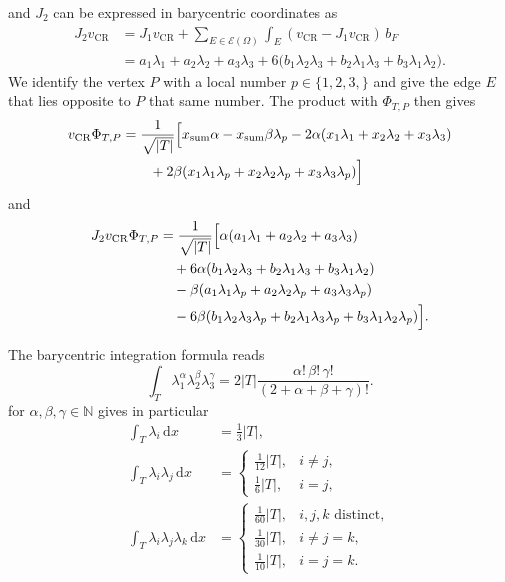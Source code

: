 \documentclass[11pt,a4paper]{article}
\newcommand{\dx}{\,\mathrm{d}x}
\begin{document}
and \(J_2\) can be expressed in barycentric coordinates as 
\begin{align*}
J_2 v_{\mathrm{CR}}
&= J_1 v_{\mathrm{CR}}
   + \sum_{E \in \mathcal{E}(\Omega)}
     \int_E (v_{\mathrm{CR}} - J_1 v_{\mathrm{CR}})\, b_F \\
&= a_1\lambda_1 + a_2\lambda_2 + a_3\lambda_3
   + 6\bigl(
      b_1 \lambda_2\lambda_3
    + b_2 \lambda_1\lambda_3
    + b_3 \lambda_1\lambda_2
     \bigr).
\end{align*}
 We identify the vertex \(P\) with a local number \(p \in \{1,2,3,\}\) and give the edge \(E\) that lies opposite to \(P\) that same number. The product with \(\Phi_{T,P}\) then gives 
\begin{align*}
v_{\mathrm{CR}}\Phi_{T,P}
&= \frac{1}{\sqrt{|T|}}
\Bigl[
x_{\mathrm{sum}}\alpha
- x_{\mathrm{sum}}\beta \lambda_p
- 2\alpha(x_1\lambda_1 + x_2\lambda_2 + x_3\lambda_3) \\
&\qquad
+ 2\beta(x_1\lambda_1\lambda_p
        + x_2\lambda_2\lambda_p
        + x_3\lambda_3\lambda_p)
\Bigr]
\end{align*}
and 
\begin{align*}
J_2 v_{\mathrm{CR}}\Phi_{T,P}
&= \frac{1}{\sqrt{|T|}}
\Bigl[
\alpha (a_1\lambda_1 + a_2\lambda_2 + a_3\lambda_3) \\
&\quad
+ 6\alpha (b_1\lambda_2\lambda_3
          + b_2\lambda_1\lambda_3
          + b_3\lambda_1\lambda_2) \\
&\quad
- \beta(a_1\lambda_1\lambda_p
        + a_2\lambda_2\lambda_p
        + a_3\lambda_3\lambda_p) \\
&\quad
- 6\beta(b_1\lambda_2\lambda_3\lambda_p
         + b_2\lambda_1\lambda_3\lambda_p
         + b_3\lambda_1\lambda_2\lambda_p)
\Bigr].
\end{align*}

The barycentric integration formula reads 
\[
\int_T \lambda_1^\alpha \lambda_2^\beta \lambda_3^\gamma
=
2|T|
\frac{\alpha!\,\beta!\,\gamma!}
{(2+\alpha+\beta+\gamma)!}.
\]
for $\alpha,\beta,\gamma \in \mathbb{N}$ gives in particular
\begin{align*}
\int_T \lambda_i \dx &= \frac{1}{3}|T|, \\
\int_T \lambda_i\lambda_j \dx
&=
\begin{cases}
\frac{1}{12}|T|, & i\neq j,\\[4pt]
\frac{1}{6}|T|, & i=j,
\end{cases}
\\[6pt]
\int_T \lambda_i\lambda_j\lambda_k \dx
&=
\begin{cases}
\frac{1}{60}|T|, & i,j,k \text{ distinct},\\[4pt]
\frac{1}{30}|T|, & i\neq j = k,\\[4pt]
\frac{1}{10}|T|, & i=j=k.
\end{cases}
\end{align*}
\end{document}
